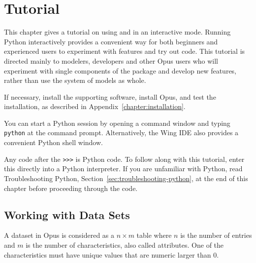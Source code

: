 
\chapter{Tutorial}
\label{urbansim-tutorial}

This chapter gives a tutorial on using  and  in an interactive mode.
Running Python \pythonindex interactively provides a convenient way for both beginners
and experienced users to experiment with features and try out code.  This
tutorial is directed mainly to modelers, developers and other Opus users
who will experiment with single components of the package and develop new
features, rather than use the system of models as whole.

If necessary, install the supporting software, install Opus, and test
the installation, as described in Appendix~\ref{chapter:installation}.

You can start a Python session by opening a command window and
typing \verb|python| at the command prompt. Alternatively, the
Wing IDE \wingindex also provides a convenient Python shell window.

Any code after the \verb|>>>| is Python code.  To follow along with this
tutorial, enter this directly into a Python interpreter.  If you are unfamiliar
with Python, read Troubleshooting Python,
Section~\ref{sec:troubleshooting-python}, at the end of this chapter before
proceeding through the code.

\section{Working with Data Sets}
\label{sec:datasets}

A dataset \datasetindex in Opus is considered as a $n \times m$ table where $n$ is the
number of entries and $m$ is the number of characteristics, \characteristicsindex also called
attributes. \attributesindex One of the characteristics \characteristicsindex must have unique values
that are numeric larger than 0.

